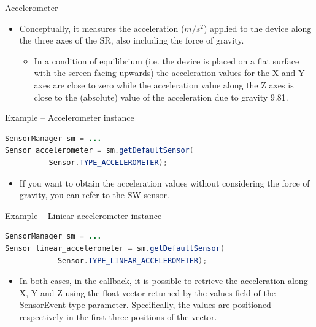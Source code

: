 \documentclass{beamer}
\begin{document}
  \begin{frame}{Accelerometer}
    \begin{itemize}
      \item Conceptually, it measures the acceleration ($m/s^{2}$) applied to
      the device along the three axes of the SR, also including the force of
      gravity.
      \begin{itemize}
        \item In a condition of equilibrium (i.e. the device is placed on a flat
        surface with the screen facing upwards) the acceleration values for the
        X and Y axes are close to zero while the acceleration value along the Z
        axes is close to the (absolute) value of the acceleration due to gravity
        9.81.
      \end{itemize}
    \end{itemize}

    \begin{exampleblock}{Example -- Accelerometer instance}
      \begin{lstlisting}[language=Java]  
SensorManager sm = ...
Sensor accelerometer = sm.getDefaultSensor(
          Sensor.TYPE_ACCELEROMETER);
      \end{lstlisting}
    \end{exampleblock}

    \begin{itemize}
      \item If you want to obtain the acceleration values without considering
      the force of gravity, you can refer to the  SW
      sensor.
    \end{itemize}

    \begin{exampleblock}{Example -- Liniear accelerometer instance}
      \begin{lstlisting}[language=Java]  
SensorManager sm = ...
Sensor linear_accelerometer = sm.getDefaultSensor(
            Sensor.TYPE_LINEAR_ACCELEROMETER);
      \end{lstlisting}
    \end{exampleblock}
    \vspace{10pt}
    \begin{itemize}
      \item In both cases, in the  callback, it is
      possible to retrieve the acceleration  along X, Y and Z
      using the float vector returned by the values field of the SensorEvent
      type parameter. Specifically, the values are positioned respectively in
      the first three positions of the vector.
    \end{itemize}

  \end{frame}
\end{document}
